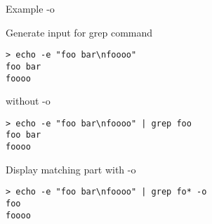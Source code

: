 \begin{frame}[fragile]{Example -o}
  \begin{exampleblock}{Generate input for grep command}
    \begin{lstlisting}[showstringspaces=false,basicstyle=\tiny]
> echo -e "foo bar\nfoooo"
foo bar
foooo
    \end{lstlisting}
  \end{exampleblock}

  \pause

  \begin{exampleblock}{without -o}
    \begin{lstlisting}[showstringspaces=false,basicstyle=\tiny]
> echo -e "foo bar\nfoooo" | grep foo
foo bar
foooo
    \end{lstlisting}
  \end{exampleblock}

  \pause

  \begin{exampleblock}{Display matching part with -o}
    \begin{lstlisting}[showstringspaces=false,basicstyle=\tiny]
> echo -e "foo bar\nfoooo" | grep fo* -o
foo
foooo
    \end{lstlisting}
  \end{exampleblock}
\end{frame}


